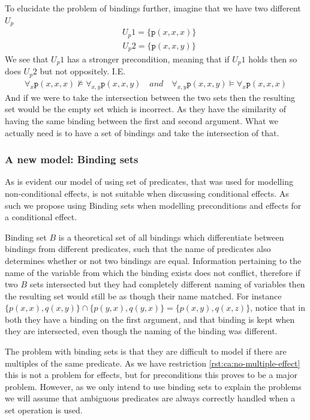 \documentclass[../Master.tex]{subfiles}
\begin{document}
\begin{example}\label{ex:ca:nonbinding-intersection-model}
To elucidate the problem of bindings further, imagine that we have two different $U_p$
\begin{align*}
&U_p1 = \{ \texttt{p}(x, x, x) \}
\end{align*}
\begin{align*}
&U_p2 = \{ \texttt{p}(x, x, y) \}
\end{align*}
We see that $U_p1$ has a stronger precondition, meaning that if $U_p1$ holds then so does $U_p2$ but not oppositely. I.E.
\begin{align*}
&\forall_{x} \texttt{p}(x, x, x) \nvDash \forall_{x, y} \texttt{p}(x, x, y)  \quad and \quad
 \forall_{x, y} \texttt{p}(x, x, y) \vDash \forall_{x} \texttt{p}(x, x, x)  &
\end{align*}
And if we were to take the intersection between the two sets then the resulting set would be the empty set which is incorrect. As they have the similarity of having the same binding between the first and second argument. What we actually need is to have a set of bindings and take the intersection of that.
\end{example}

\subsubsection{A new model: Binding sets}
As is evident our model of using set of predicates, that was used for modelling non-conditional effects, is not suitable when discussing conditional effects. As such we propose using Binding sets when modelling preconditions and effects for a conditional effect.

\begin{definition}\label{thm:ca:binding-set}
	Binding set $B$ is a theoretical set of all bindings which differentiate between bindings from different predicates, such that the name of predicates also determines whether or not two bindings are equal. Information pertaining to the name of the variable from which the binding exists does not conflict, therefore if two $B$ sets intersected but they had completely different naming of variables then the resulting set would still be as though their name matched.
	For instance $\{p(x,x), q(x,y)\} \cap \{p(y,x), q(y,x)\} = \{p(x,y), q(x,z)\}$, notice that in both they have a binding on the first argument, and that binding is kept when they are intersected, even though the naming of the binding was different.
\end{definition}
The problem with binding sets is that they are difficult to model if there are multiples of the same predicate. As we have restriction \ref{rst:ca:no-multiple-effect} this is not a problem for effects, but for preconditions this proves to be a major problem. However, as we only intend to use binding sets to explain the problems we will assume that ambiguous predicates are always correctly handled when a set operation is used.
\end{document}
